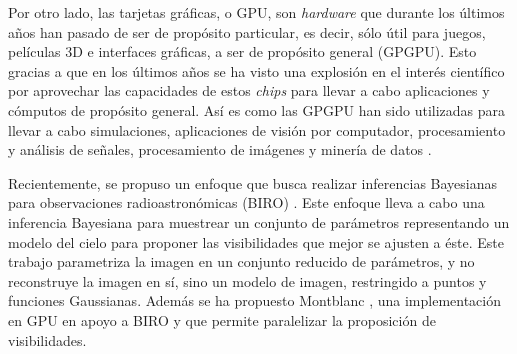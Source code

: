 Por otro lado, las tarjetas gráficas, o GPU, son \textit{hardware} que durante los últimos años han pasado de ser de propósito particular, es decir, sólo útil para juegos, películas 3D e interfaces gráficas, a ser de propósito general (GPGPU). Esto gracias a que en los últimos años se ha visto una explosión en el interés científico por aprovechar las capacidades de estos \textit{chips} para llevar a cabo aplicaciones y cómputos de propósito general. Así es como las GPGPU han sido utilizadas para llevar a cabo simulaciones, aplicaciones de visión por computador, procesamiento y análisis de señales, procesamiento de imágenes y minería de datos \citep{Owens:2007:ASO}.


Recientemente, se propuso un enfoque que busca realizar inferencias Bayesianas para observaciones radioastronómicas (BIRO) \citep{BIRO}. Este enfoque lleva a cabo una inferencia Bayesiana para muestrear un conjunto de parámetros representando un modelo del cielo para proponer las visibilidades que mejor se ajusten a éste. Este trabajo parametriza la imagen en un conjunto reducido de parámetros, y no reconstruye la imagen en sí, sino un modelo de imagen, restringido a puntos y funciones Gaussianas. Además se ha propuesto Montblanc \citep{montblanc}, una implementación en GPU en apoyo a BIRO y que permite paralelizar la proposición de visibilidades.

